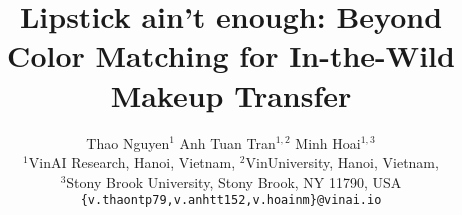 \documentclass[final]{cvpr}
\begin{document}
\newif\ifshowsolution
\showsolutiontrue

\ifshowsolution  
\newcommand{\Comment}[1]{\paragraph{\bf $\bigstar $ COMMENT:} {\sf #1} \bigskip}
\newcommand{\Solution}[2]{\paragraph{\bf $\bigstar $ SOLUTION:} {\sf #2} }
\newcommand{\Mistake}[2]{\paragraph{\bf $\blacksquare$ COMMON MISTAKE #1:} {\sf #2} \bigskip}
\else
\newcommand{\Solution}[2]{\vspace{#1}}
\fi

\newcommand{\truefalse}{
\begin{enumerate}
	\item True
	\item False
\end{enumerate}
}

\newcommand{\yesno}{
\begin{enumerate}
	\item Yes
	\item No
\end{enumerate}
}

 
\title{Lipstick ain't enough: Beyond Color Matching for In-the-Wild Makeup Transfer}




\author{
Thao Nguyen$^{1}$ \quad Anh Tuan Tran$^{1,2}$ \quad Minh Hoai$^{1,3}$ \\
$^1$VinAI Research, Hanoi, Vietnam,
$^2$VinUniversity, Hanoi, Vietnam,\\
$^3$Stony Brook University, Stony Brook, NY 11790, USA\\
{\tt\small \{v.thaontp79,v.anhtt152,v.hoainm\}@vinai.io}
}

\makeatletter
\let\@oldmaketitle\@maketitle

\renewcommand{\@maketitle}{\@oldmaketitle
\vspace{-8mm}
\centering
\texttt{[image: imgs/teaser\_3.pdf]}
\vskip -0.1in
\captionof{figure}{In-the-wild facial makeup consists of both color transfer and pattern addition. We propose a holistic method that can transfer the color and pattern from a reference makeup style to another image.} \label{fig:feature-graphic}

\vspace{3mm}
}
\makeatletter
\end{document}
